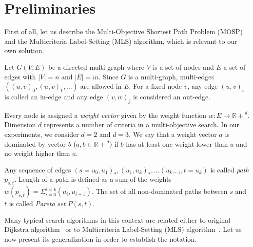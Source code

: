 
\section{Preliminaries}
\label{secPreliminaries}

First of all, let us describe the Multi-Objective Shortest Path Problem (MOSP) and the Multicriteria Label-Setting (MLS) algorithm, which is relevant to our own solution.

Let $G(V,E)$ be a directed multi-graph where $V$ is a set of nodes and $E$ a set
of edges with $|V| = n$ and $|E| = m$. Since $G$ is a multi-graph, multi-edges
$((u,v)_0,(u,v)_1,\dots)$ are allowed in $E$. For a fixed node $v$, any edge $(u,v)_i$ is called an in-edge and any edge $(v,w)_j$ is considered an out-edge.

Every node is assigned a \emph{weight vector} given by the weight function $w: E \rightarrow \mathbb{R+}^d$. Dimension $d$ represents a number of criteria in a multi-objective search. 
In our experiments, we consider $d=2$ and $d=3$.
We say that a weight vector $a$ is dominated by vector $b$ ($a,b \in \mathbb{R+}^d$) if
$b$ has at least one weight lower than $a$ and no weight higher than $a$. 

Any sequence of edges $(s=u_0,u_1)_*,(u_1,u_k)_*,\dots(u_{k-1},t=u_k)$ is called
\emph{path} $p_{s,t}$. Length of a path is defined as a sum of the weights 
$w(p_{s,t}) = \Sigma_{i=0}^{i<k} (u_i,u_{i+1})$. The set of all non-dominated paths between $s$ and $t$ is called {\em Pareto set}
$P(s,t)$.


Many typical search algorithms in this context are related either to original Dijkstra algorithm~\cite{dijkstra1959note} or to Multicriteria Label-Setting (MLS) algorithm~\cite{martins1984multicriteria}. Let us now present its generalization in order to establish the notation.

